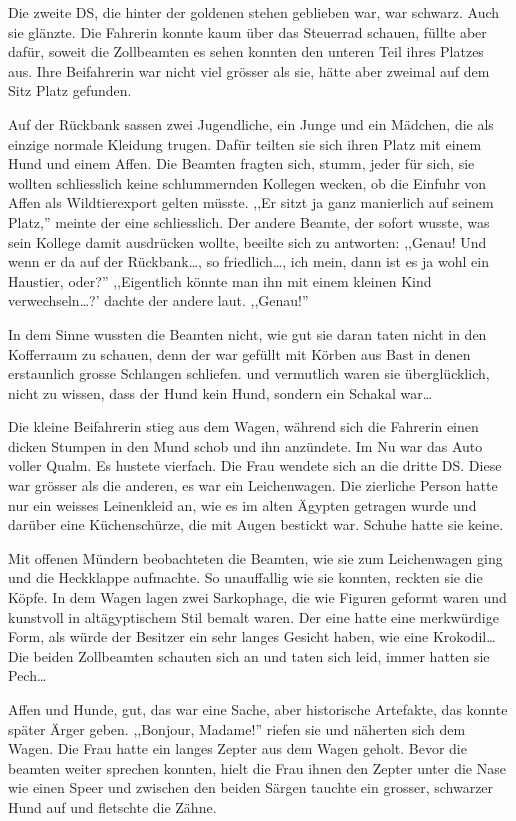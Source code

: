 \documentclass[11pt,titlepage,a5paper]{book}
\begin{document}
Die zweite DS, die hinter der goldenen stehen geblieben war, war schwarz. Auch sie glänzte. Die Fahrerin konnte kaum über das Steuerrad schauen, füllte aber dafür, soweit die Zollbeamten es sehen konnten den unteren Teil ihres Platzes aus. Ihre Beifahrerin war nicht viel grösser als sie, hätte aber zweimal auf dem Sitz Platz gefunden.

Auf der Rückbank sassen zwei Jugendliche, ein Junge und ein Mädchen, die als einzige normale Kleidung trugen. Dafür teilten sie sich ihren Platz mit einem Hund und einem Affen. Die Beamten fragten sich, stumm, jeder für sich, sie wollten schliesslich keine schlummernden Kollegen wecken, ob die Einfuhr von Affen als Wildtierexport gelten müsste. ,,Er sitzt ja ganz manierlich auf seinem Platz,'' meinte der eine schliesslich. Der andere Beamte, der sofort wusste, was sein Kollege damit ausdrücken wollte, beeilte sich zu antworten: ,,Genau! Und wenn er da auf der Rückbank\dots , so friedlich\dots , ich mein, dann ist es ja wohl ein Haustier, oder?'' ,,Eigentlich könnte man ihn mit einem kleinen Kind verwechseln\dots ?' dachte der andere laut. ,,Genau!''
 
 In dem Sinne wussten die Beamten nicht, wie gut sie daran taten nicht in den Kofferraum zu schauen, denn der war gefüllt mit Körben aus Bast in denen erstaunlich grosse Schlangen schliefen. und vermutlich waren sie überglücklich, nicht zu wissen, dass der Hund kein Hund, sondern ein Schakal war\dots
 
Die kleine Beifahrerin stieg aus dem Wagen, während sich die Fahrerin einen dicken Stumpen in den Mund schob und ihn anzündete. Im Nu war das Auto voller Qualm. Es hustete vierfach. Die Frau wendete sich an die dritte DS. Diese war grösser als die anderen, es war ein Leichenwagen. Die zierliche Person hatte nur ein weisses Leinenkleid an, wie es im alten Ägypten getragen wurde und darüber eine Küchenschürze, die mit Augen bestickt war. Schuhe hatte sie keine.

Mit offenen Mündern beobachteten die Beamten, wie sie zum Leichenwagen ging und die Heckklappe aufmachte. So unauffallig wie sie konnten, reckten sie die Köpfe. In dem Wagen lagen zwei Sarkophage, die wie Figuren geformt waren und kunstvoll in altägyptischem Stil bemalt waren. Der eine hatte eine merkwürdige Form, als würde der Besitzer ein sehr langes Gesicht haben, wie eine Krokodil\dots Die beiden Zollbeamten schauten sich an und taten sich leid, immer hatten sie Pech\dots

Affen und Hunde, gut, das war eine Sache, aber historische Artefakte, das konnte später Ärger geben. ,,Bonjour, Madame!'' riefen sie und näherten sich dem Wagen. Die Frau hatte ein langes Zepter aus dem Wagen geholt. Bevor die beamten weiter sprechen konnten, hielt die Frau ihnen den Zepter unter die Nase wie einen Speer und zwischen den beiden Särgen tauchte ein grosser, schwarzer Hund auf und fletschte die Zähne.
\end{document}
